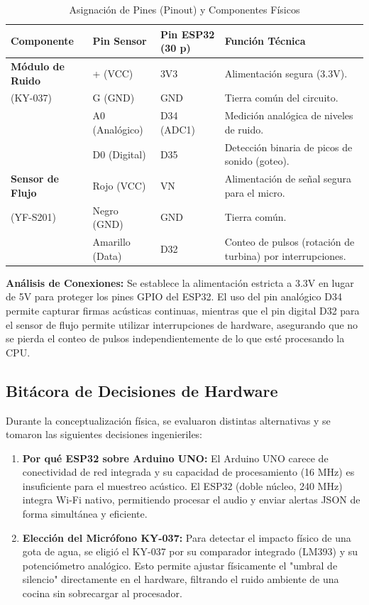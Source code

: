 \documentclass[11pt,a4paper]{article}
\begin{document}
\begin{table}[htpb]
    \centering
    \caption{Asignación de Pines (Pinout) y Componentes Físicos}
    \begin{tabularx}{\textwidth}{l l l X}
        \toprule
        \textbf{Componente} & \textbf{Pin Sensor} & \textbf{Pin ESP32 (30 p)} & \textbf{Función Técnica} \\
        \midrule
        \textbf{Módulo de Ruido} & + (VCC) & 3V3 & Alimentación segura (3.3V). \\
        (KY-037) & G (GND) & GND & Tierra común del circuito. \\
         & A0 (Analógico) & D34 (ADC1) & Medición analógica de niveles de ruido. \\
         & D0 (Digital) & D35 & Detección binaria de picos de sonido (goteo). \\
        \midrule
        \textbf{Sensor de Flujo} & Rojo (VCC) & VN & Alimentación de señal segura para el micro.\\
        (YF-S201) & Negro (GND) & GND & Tierra común. \\
         & Amarillo (Data) & D32 & Conteo de pulsos (rotación de turbina) por interrupciones.\\
        \bottomrule
    \end{tabularx}
\end{table}

\textbf{Análisis de Conexiones:} Se establece la alimentación estricta a 3.3V en lugar de 5V para proteger los pines GPIO del ESP32. El uso del pin analógico D34 permite capturar firmas acústicas continuas, mientras que el pin digital D32 para el sensor de flujo permite utilizar interrupciones de hardware, asegurando que no se pierda el conteo de pulsos independientemente de lo que esté procesando la CPU.

\subsection{Bitácora de Decisiones de Hardware}

Durante la conceptualización física, se evaluaron distintas alternativas y se tomaron las siguientes decisiones ingenieriles:

\begin{enumerate}
    \item \textbf{Por qué ESP32 sobre Arduino UNO:} El Arduino UNO carece de conectividad de red integrada y su capacidad de procesamiento (16 MHz) es insuficiente para el muestreo acústico. El ESP32 (doble núcleo, 240 MHz) integra Wi-Fi nativo, permitiendo procesar el audio y enviar alertas JSON de forma simultánea y eficiente.
    \item \textbf{Elección del Micrófono KY-037:} Para detectar el impacto físico de una gota de agua, se eligió el KY-037 por su comparador integrado (LM393) y su potenciómetro analógico. Esto permite ajustar físicamente el "umbral de silencio" directamente en el hardware, filtrando el ruido ambiente de una cocina sin sobrecargar al procesador.
\end{enumerate}
\end{document}
